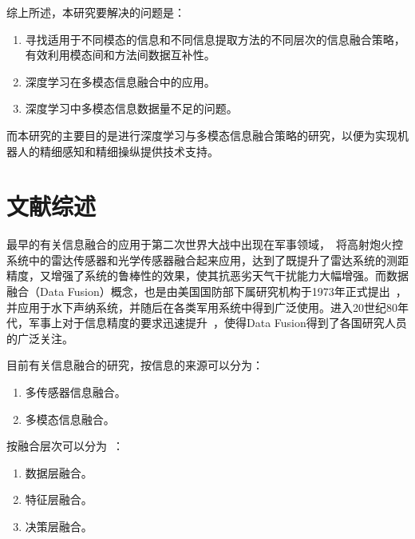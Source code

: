 综上所述，本研究要解决的问题是：
\begin{enumerate}
  \item 寻找适用于不同模态的信息和不同信息提取方法的不同层次的信息融合策略，有效利用模态间和方法间数据互补性。
  \item 深度学习在多模态信息融合中的应用。
  \item 深度学习中多模态信息数据量不足的问题。
\end{enumerate}

而本研究的主要目的是进行深度学习与多模态信息融合策略的研究，以便为实现机器人的精细感知和精细操纵提供技术支持。

\section{文献综述}
\label{sec:literaturereview}

最早的有关信息融合的应用于第二次世界大战中出现在军事领域，~将高射炮火控系统中的雷达传感器和光学传感器融合起来应用，达到了既提升了雷达系统的测距精度，又增强了系统的鲁棒性的效果，使其抗恶劣天气干扰能力大幅增强。而数据融合（Data Fusion）概念，也是由美国国防部下属研究机构于1973年正式提出~，并应用于水下声纳系统，并随后在各类军用系统中得到广泛使用。进入20世纪80年代，军事上对于信息精度的要求迅速提升~，使得Data Fusion得到了各国研究人员的广泛关注。

目前有关信息融合的研究，按信息的来源可以分为：
\begin{enumerate}
  \item 多传感器信息融合。
  \item 多模态信息融合。
\end{enumerate}
按融合层次可以分为~：
\begin{enumerate}
  \item 数据层融合。
  \item 特征层融合。
  \item 决策层融合。
\end{enumerate}

